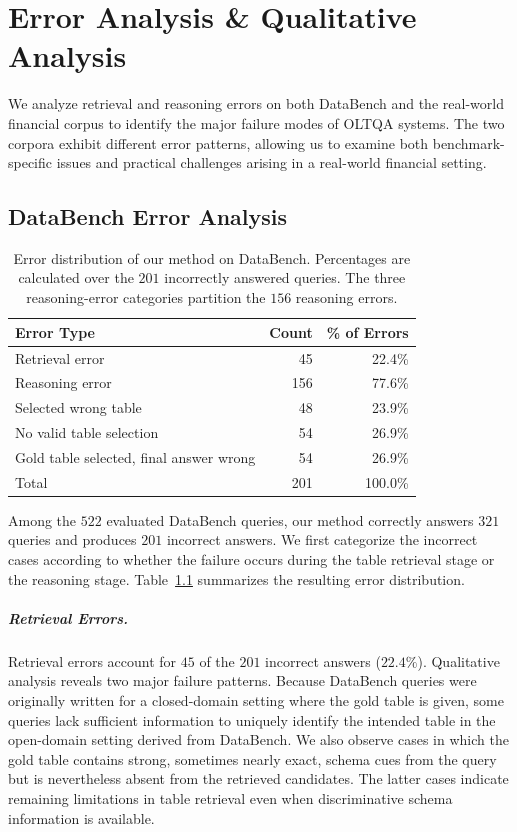 \chapter{Error Analysis \& Qualitative Analysis}
\label{sec:error_analysis}
We analyze retrieval and reasoning errors on both DataBench and the real-world financial corpus to identify the major failure modes of OLTQA systems.
The two corpora exhibit different error patterns, allowing us to examine both benchmark-specific issues and practical challenges arising in a real-world financial setting.

\section{DataBench Error Analysis}

\begin{table}[t]
\centering
\small
\begin{tabular}{lrr}
\hline
\textbf{Error Type} & \textbf{Count} & \textbf{\% of Errors} \\
\hline
Retrieval error & 45 & 22.4\% \\
Reasoning error & 156 & 77.6\% \\
\quad Selected wrong table & 48 & 23.9\% \\
\quad No valid table selection & 54 & 26.9\% \\
\quad Gold table selected, final answer wrong & 54 & 26.9\% \\
\hline
Total & 201 & 100.0\% \\
\hline
\end{tabular}
\caption{Error distribution of our method on DataBench. Percentages are calculated over the $201$ incorrectly answered queries. The three reasoning-error categories partition the $156$ reasoning errors.}
\label{tab:databench_error_distribution}
\end{table}

Among the $522$ evaluated DataBench queries, our method correctly answers $321$ queries and produces $201$ incorrect answers.
We first categorize the incorrect cases according to whether the failure occurs during the table retrieval stage or the reasoning stage.
Table~\ref{tab:databench_error_distribution} summarizes the resulting error distribution.


\paragraph{Retrieval Errors.}
Retrieval errors account for $45$ of the $201$ incorrect answers ($22.4\%$).
Qualitative analysis reveals two major failure patterns.
Because DataBench queries were originally written for a closed-domain setting where the gold table is given, some queries lack sufficient information to uniquely identify the intended table in the open-domain setting derived from DataBench.
We also observe cases in which the gold table contains strong, sometimes nearly exact, schema cues from the query but is nevertheless absent from the retrieved candidates.
The latter cases indicate remaining limitations in table retrieval even when discriminative schema information is available.

